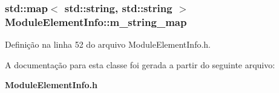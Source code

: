 \subsubsection[{m\+\_\+string\+\_\+map}]{\setlength{\rightskip}{0pt plus 5cm}std\+::map$<$ std\+::string, std\+::string $>$ Module\+Element\+Info\+::m\+\_\+string\+\_\+map\hspace{0.3cm}{\ttfamily [protected]}}\label{class_module_element_info_ab14153ccb07cf29b247ab6a8cb8b7640}


Definição na linha 52 do arquivo Module\+Element\+Info.\+h.



A documentação para esta classe foi gerada a partir do seguinte arquivo\+:\begin{DoxyCompactItemize}
\item 
{\bf Module\+Element\+Info.\+h}\end{DoxyCompactItemize}
